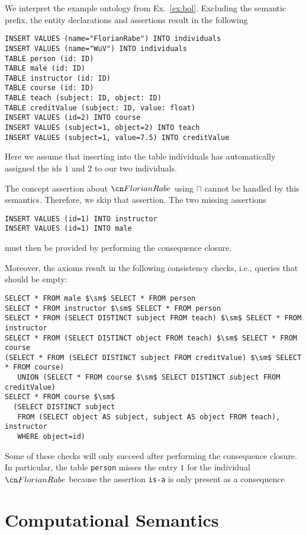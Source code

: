 \begin{example}
We interpret the example ontology from Ex.~\ref{ex:bol}.
Excluding the semantic prefix, the entity declarations and assertions result in the following
\begin{lstlisting}
INSERT VALUES (name="FlorianRabe") INTO individuals
INSERT VALUES (name="WuV") INTO individuals
TABLE person (id: ID)
TABLE male (id: ID)
TABLE instructor (id: ID)
TABLE course (id: ID)
TABLE teach (subject: ID, object: ID)
TABLE creditValue (subject: ID, value: float)
INSERT VALUES (id=2) INTO course
INSERT VALUES (subject=1, object=2) INTO teach
INSERT VALUES (subject=1, value=7.5) INTO creditValue
\end{lstlisting}

Here we assume that inserting into the table individuals has automatically assigned the ids $1$ and $2$ to our two individuals.

The concept assertion about $\FR$ using $\sqcap$ cannot be handled by this semantics.
Therefore, we skip that assertion.
The two missing assertions
\begin{lstlisting}
INSERT VALUES (id=1) INTO instructor
INSERT VALUES (id=1) INTO male
\end{lstlisting}
must then be provided by performing the consequence closure.

Moreover, the axioms result in the following consistency checks, i.e., queries that should be empty:
\begin{lstlisting}
SELECT * FROM male $\sm$ SELECT * FROM person
SELECT * FROM instructor $\sm$ SELECT * FROM person
SELECT * FROM (SELECT DISTINCT subject FROM teach) $\sm$ SELECT * FROM instructor
SELECT * FROM (SELECT DISTINCT object FROM teach) $\sm$ SELECT * FROM course
(SELECT * FROM (SELECT DISTINCT subject FROM creditValue) $\sm$ SELECT * FROM course)
   UNION (SELECT * FROM course $\sm$ SELECT DISTINCT subject FROM creditValue)
SELECT * FROM course $\sm$
  (SELECT DISTINCT subject
   FROM (SELECT object AS subject, subject AS object FROM teach), instructor
   WHERE object=id)
\end{lstlisting}
Some of these checks will only succeed after performing the consequence closure.
In particular, the table \verb|person| misses the entry $1$ for the individual $\FR$ because the assertion {\FR\;\texttt{is-a}\;\person} is only present as a consequence
\end{example}

\section{Computational Semantics}\label{sec:bolsem:comp}

